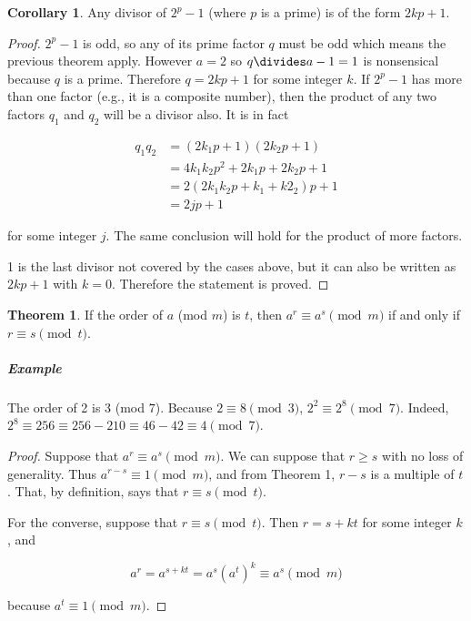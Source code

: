 \documentclass{article}
\theoremstyle{definition} %
\newtheorem{theorem}{Theorem}[section] %
\theoremstyle{definition}
\newtheorem{corollary}{Corollary}[section] %
\theoremstyle{definition}
\theoremstyle{definition}
\begin{document}
  \begin{corollary}
    Any divisor of $2^p - 1$ (where $p$ is a prime) is of the form $2kp + 1$.
  \end{corollary}
  
  \begin{proof}
    $2^p - 1$ is odd, so any of its prime factor $q$ must be odd which means the previous theorem apply. However
    $a = 2$ so $q \divides a - 1 = 1$ is nonsensical because $q$ is a prime. Therefore $q = 2kp + 1$ for
    some integer $k$. If $2^p - 1$ has more than one factor (e.g., it is a composite number), then the product
    of any two factors $q_1$ and $q_2$ will be a divisor also. It is in fact
    
    \begin{align*}
      q_1q_2 &= (2k_1p + 1)(2k_2p + 1) \\
        &= 4k_1k_2p^2 + 2k_1p + 2k_2p + 1 \\
        &= 2(2k_1k_2p + k_1 + k2_2)p + 1 \\
        &= 2jp + 1
    \end{align*}
    
    for some integer $j$. The same conclusion will hold for the product of more factors.
    
    1 is the last divisor not covered by the cases above, but it can also be written as $2kp + 1$ with
    $k = 0$. Therefore the statement is proved.
  \end{proof}
  
  \begin{theorem}
    If the order of $a$ (mod $m$) is $t$, then $a^r \equiv a^s \pmod{m}$ if and only if $r \equiv s \pmod{t}$.
  \end{theorem}
  
  \subparagraph{Example} The order of 2 is 3 (mod $7$). Because $2 \equiv 8 \pmod{3}$, $2^2 \equiv 2^8 \pmod{7}$.
    Indeed, $2^8 \equiv 256 \equiv 256 - 210 \equiv 46 - 42 \equiv 4 \pmod{7}$.
  
  \begin{proof}
    Suppose that $a^r \equiv a^s \pmod{m}$. We can suppose that $r \geq s$ with no loss of generality.
    Thus $a^{r - s} \equiv 1 \pmod{m}$, and from Theorem 1, $r - s$ is a multiple of $t$. That, by definition,
    says that $r \equiv s \pmod{t}$.
    
    For the converse, suppose that $r \equiv s \pmod{t}$. Then $r = s + kt$ for some integer $k$, and
    
    \[ a^r = a^{s + kt} = a^s(a^t)^k \equiv a^s \pmod{m} \]
    
    because $a^t \equiv 1 \pmod{m}$.
  \end{proof}
  
\end{document}
